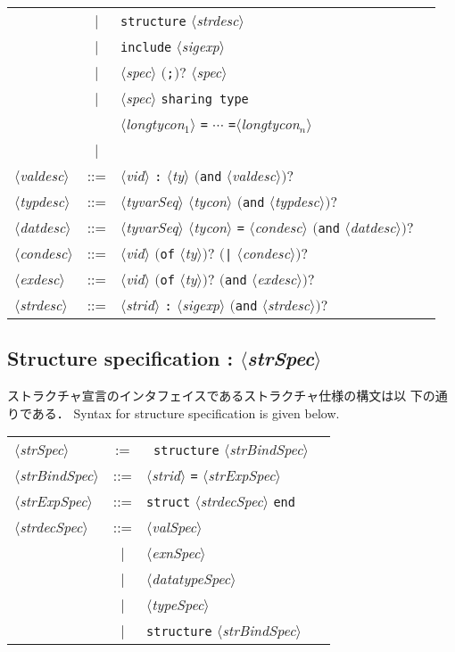 \documentclass{jbook}
\newcommand{\txt}[2]{#2}
\newcommand{\vbar}{\mbox{\ $|$\ }}
\newcommand{\nonterm}[1]{\mbox{$\langle$}{\it #1}\mbox{$\rangle$}}
\newcommand{\term}[1]{\mbox{{\tt #1}}}
\newcommand{\optional}[1]{\mbox{$($}{\protect #1}\mbox{$)?$}}
\begin{document}
\begin{center}
\begin{tabular}{lcll}
&\vbar& \term{structure} \nonterm{strdesc}\\
&\vbar&  \term{include} \nonterm{sigexp} \\
&\vbar&  \nonterm{spec} \optional{\term{;}} \nonterm{spec} \\
&\vbar&  \nonterm{spec} \term{sharing type}\\
&&        \nonterm{longtycon$_1$} \term{=} $\cdots$ \term{=}\nonterm{longtycon$_n$}\\
&\vbar&  &\\
\nonterm{valdesc} &::=& \nonterm{vid} \term{:} \nonterm{ty} \optional{\term{and} \nonterm{valdesc}}\\
\nonterm{typdesc} &::=& \nonterm{tyvarSeq} \nonterm{tycon} \optional{\term{and} \nonterm{typdesc}}\\
\nonterm{datdesc} &::=& \nonterm{tyvarSeq} \nonterm{tycon} \term{=} \nonterm{condesc}  \optional{\term{and} \nonterm{datdesc}}\\
\nonterm{condesc} &::=& \nonterm{vid} \optional{\term{of} \nonterm{ty}} \optional{\term{|} \nonterm{condesc}}\\
\nonterm{exdesc} &::=& \nonterm{vid} \optional{\term{of} \nonterm{ty}} \optional{\term{and} \nonterm{exdesc}}\\
\nonterm{strdesc} &::=& \nonterm{strid} \term{:} \nonterm{sigexp} \optional{\term{and} \nonterm{strdesc}}
\end{tabular}
\end{center}

\subsection{\txt{ストラクチャインターフェイス}{Structure specification} : \nonterm{strSpec}}
\ifjp%
	ストラクチャ宣言のインタフェイスであるストラクチャ仕様の構文は以
下の通りである．
\else%
	Syntax for structure specification is given below.
\fi%

\begin{center}
\begin{tabular}{lcll}
\nonterm{strSpec}
  &:= &\ \term{structure} \nonterm{strBindSpec}\\
\nonterm{strBindSpec} &::=&
	\nonterm{strid} \term{=} \nonterm{strExpSpec}\\
\nonterm{strExpSpec} &::=& \term{struct} \nonterm{strdecSpec} \term{end}\\
\nonterm{strdecSpec} &::=& \nonterm{valSpec} \\
&\vbar& \nonterm{exnSpec}\\
&\vbar& \nonterm{datatypeSpec}\\
&\vbar& \nonterm{typeSpec}\\
&\vbar& \term{structure} \nonterm{strBindSpec}\\
\end{tabular}
\end{center}
\end{document}
